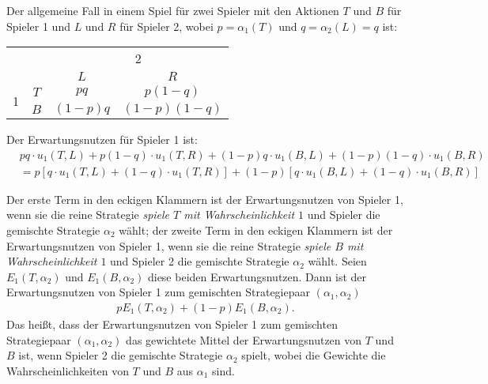 Der allgemeine Fall in einem Spiel für zwei Spieler mit den Aktionen $T$ und $B$ für
Spieler 1 und $L$ und $R$ für Spieler 2, wobei $p = α_1(T)$ und $q = α_2(L) = q$ ist:
\begin{center}
  \begin{tabular}{cccc}
    & & \multicolumn{2}{c}{2}\\
    & & $L$ & $R$\\
    \cmidrule{2-4}
    \multirow{2}{*}{1}
      & $T$ & $pq$ & $p(1-q)$\\
    \cmidrule{2-4}
      & $B$ & $(1-p)q$ & $(1-p)(1-q)$\\
    \cmidrule{2-4}
  \end{tabular}
\end{center}

Der Erwartungsnutzen für Spieler 1 ist:
\begin{align*}
  & pq \cdot u_1(T,L)
  + p(1-q) \cdot u_1(T,R)
  + (1-p)q \cdot u_1(B,L)
  + (1-p)(1-q) \cdot u_1(B,R)\\
  & =
    p     \left[ q \cdot u_1(T,L) + (1-q) \cdot u_1(T,R) \right]
  + (1-p) \left[ q \cdot u_1(B,L) + (1-q) \cdot u_1(B,R) \right]
\end{align*}

Der erste Term in den eckigen Klammern ist der Erwartungsnutzen von Spieler 1,
wenn sie die reine Strategie \emph{spiele $T$ mit Wahrscheinlichkeit $1$}
und Spieler die gemischte Strategie $α_2$ wählt;
der zweite Term in den eckigen Klammern ist der Erwartungsnutzen von Spieler 1,
wenn sie die reine Strategie \emph{spiele $B$ mit Wahrscheinlichkeit $1$}
und Spieler 2 die gemischte Strategie $α_2$ wählt.
Seien $E_1(T, α_2)$ und $E_1(B, α_2)$ diese beiden Erwartungsnutzen.
Dann ist der Erwartungsnutzen von Spieler 1 zum gemischten Strategiepaar $(α_1, α_2)$
\begin{align*}
  p E_1(T, α_2) + (1-p) E_1(B, α_2).
\end{align*}
Das heißt, dass der Erwartungsnutzen von Spieler 1 zum gemischten Strategiepaar
$(α_1, α_2)$ das gewichtete Mittel der Erwartungsnutzen von $T$ und $B$ ist,
wenn Spieler 2 die gemischte Strategie $α_2$ spielt,
wobei die Gewichte die Wahrscheinlichkeiten von $T$ und $B$ aus $α_1$ sind.

